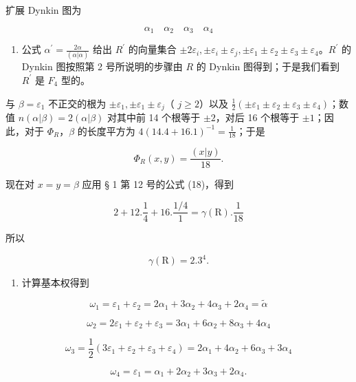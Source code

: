 扩展 Dynkin 图为

\[
\alpha_ {1} \quad \alpha_ {2} \quad \alpha_ {3} \quad \alpha_ {4}
\]

\begin{enumerate}
\def\labelenumi{(\Alph{enumi})}
\setcounter{enumi}{21}
\tightlist
\item
  公式 \(\alpha^{\prime} = \frac{2\alpha}{(\alpha|\alpha)}\) 给出 \(R^{\prime}\) 的向量集合 \(\pm 2\varepsilon_{i}, \pm \varepsilon_{i} \pm \varepsilon_{j}, \pm \varepsilon_{1} \pm \varepsilon_{2} \pm \varepsilon_{3} \pm \varepsilon_{4}\)。\(R^{\prime}\) 的 Dynkin 图按照第 2 号所说明的步骤由 \(R\) 的 Dynkin 图得到；于是我们看到 \(R^{\prime}\) 是 \(F_{4}\) 型的。
\end{enumerate}

与 \(\beta = \varepsilon_1\) 不正交的根为 \(\pm \varepsilon_1, \pm \varepsilon_1 \pm \varepsilon_j\)（ \(j \geqslant 2\)）以及 \(\frac{1}{2} (\pm \varepsilon_1 \pm \varepsilon_2 \pm \varepsilon_3 \pm \varepsilon_4)\)；数值 \(n(\alpha | \beta) = 2(\alpha | \beta)\) 对其中前 14 个根等于 \(\pm 2\)，对后 16 个根等于 \(\pm 1\)；因此，对于 \(\Phi_R\)，\(\beta\) 的长度平方为 \(4(14.4 + 16.1)^{-1} = \frac{1}{18}\)；于是

\[
\Phi_ {R} (x, y) = \frac {(x | y)}{18}.
\]

现在对 \(x = y = \beta\) 应用 § 1 第 12 号的公式 (18)，得到

\[
2 + 12. \frac {1}{4} + 16. \frac {1 / 4}{1} = \gamma (\mathrm{R}). \frac {1}{18}
\]

所以

\[
\gamma (\mathrm{R}) = 2. 3 ^ {4}.
\]

\begin{enumerate}
\def\labelenumi{(\Roman{enumi})}
\setcounter{enumi}{5}
\tightlist
\item
  计算基本权得到
\end{enumerate}

\[
\omega_ {1} = \varepsilon_ {1} + \varepsilon_ {2} = 2 \alpha_ {1} + 3 \alpha_ {2} + 4 \alpha_ {3} + 2 \alpha_ {4} = \tilde {\alpha}
\]

\[
\omega_ {2} = 2 \varepsilon_ {1} + \varepsilon_ {2} + \varepsilon_ {3} = 3 \alpha_ {1} + 6 \alpha_ {2} + 8 \alpha_ {3} + 4 \alpha_ {4}
\]

\[
\omega_ {3} = \frac {1}{2} (3 \varepsilon_ {1} + \varepsilon_ {2} + \varepsilon_ {3} + \varepsilon_ {4}) = 2 \alpha_ {1} + 4 \alpha_ {2} + 6 \alpha_ {3} + 3 \alpha_ {4}
\]

\[
\omega_ {4} = \varepsilon_ {1} = \alpha_ {1} + 2 \alpha_ {2} + 3 \alpha_ {3} + 2 \alpha_ {4}.
\]

